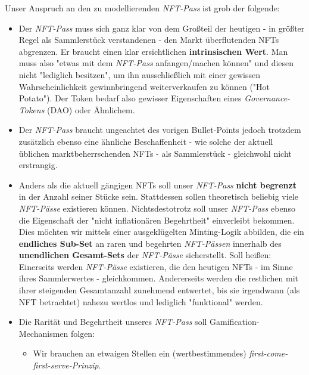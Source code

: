 
Unser Anspruch an den zu modellierenden \textit{NFT-Pass} ist grob der folgende:

\vspace{0.2cm}

\begin{itemize}
  \item Der \textit{NFT-Pass} muss sich ganz klar von dem Großteil der heutigen - in größter Regel als Sammlerstück verstandenen - den Markt überflutenden NFTs abgrenzen. Er braucht einen klar ersichtlichen \textbf{intrinsischen Wert}. Man muss also "etwas mit dem \textit{NFT-Pass} anfangen/machen können" und diesen nicht "lediglich besitzen", um ihn ausschließlich mit einer gewissen Wahrscheinlichkeit gewinnbringend weiterverkaufen zu können ("Hot Potato"). Der Token bedarf also gewisser Eigenschaften eines \textit{Governance-Tokens} (DAO) oder Ähnlichem.
  \item 
  \begin{sloppypar}  
  Der \textit{NFT-Pass} braucht ungeachtet des vorigen Bullet-Points jedoch trotzdem zusätzlich ebenso eine ähnliche Beschaffenheit - wie solche der aktuell üblichen marktbeherrschenden NFTs - als Sammlerstück - gleichwohl nicht erstrangig. 
  \end{sloppypar}
  \item Anders als die aktuell gängigen NFTs soll unser \textit{NFT-Pass} \textbf{nicht begrenzt} in der Anzahl seiner Stücke sein. Stattdessen sollen theoretisch beliebig viele \textit{NFT-Pässe} existieren können. Nichtsdestotrotz soll unser \textit{NFT-Pass} ebenso die Eigenschaft der "nicht inflationären Begehrtheit" einverleibt bekommen. Dies möchten wir mittels einer ausgeklügelten Minting-Logik abbilden, die ein \textbf{endliches Sub-Set} an raren und begehrten \textit{NFT-Pässen} innerhalb des \textbf{unendlichen Gesamt-Sets} der \textit{NFT-Pässe} sicherstellt. Soll heißen: Einerseits werden \textit{NFT-Pässe} exis\-tieren, die den heutigen NFTs - im Sinne ihres Sammlerwertes - gleichkommen. Andererseits werden die restlichen mit ihrer steigenden Gesamtanzahl zunehmend entwertet, bis sie irgendwann (als NFT betrachtet) nahezu wertlos und lediglich "funktional" werden.
  \item Die Rarität und Begehrtheit unseres \textit{NFT-Pass} soll Gamification-Mechanismen folgen:
  \begin{itemize}
    \item Wir brauchen an etwaigen Stellen ein (wertbestimmendes) \textit{first-come-first-serve-Prinzip}.

\end{itemize}
\end{itemize}

